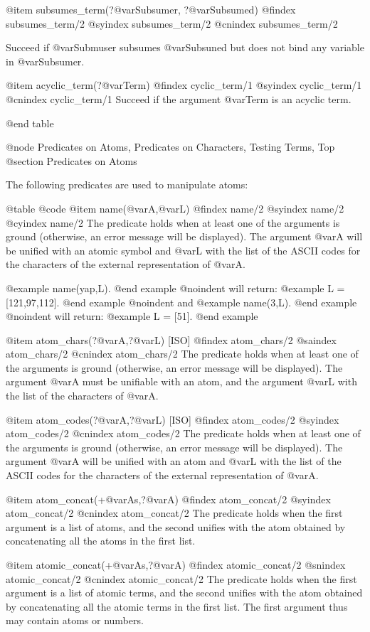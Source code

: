 {{{{@item subsumes_term(?@var{Subsumer}, ?@var{Subsumed})
@findex  subsumes_term/2
@syindex subsumes_term/2
@cnindex subsumes_term/2

Succeed if @var{Submuser} subsumes @var{Subsuned} but does not bind any
variable in @var{Subsumer}.

@item acyclic_term(?@var{Term})
@findex cyclic_term/1
@syindex cyclic_term/1
@cnindex cyclic_term/1
Succeed if the argument @var{Term} is an acyclic term.


@end table

@node Predicates on Atoms, Predicates on Characters, Testing Terms, Top
@section Predicates on Atoms

The following predicates are used to manipulate atoms:

@table @code
@item name(@var{A},@var{L})
@findex name/2
@syindex name/2
@cyindex name/2
The predicate holds when at least one of the arguments is ground
(otherwise, an error message will be displayed). The argument @var{A} will
be unified with an atomic symbol and @var{L} with the list of the ASCII
codes for the characters of the external representation of @var{A}.

@example
 name(yap,L).
@end example
@noindent
will return:
@example
 L = [121,97,112].
@end example
@noindent
and
@example
 name(3,L).
@end example
@noindent
will return:
@example
 L = [51].
@end example

@item atom_chars(?@var{A},?@var{L}) [ISO]
@findex atom_chars/2
@saindex atom_chars/2
@cnindex atom_chars/2
The predicate holds when at least one of the arguments is ground
(otherwise, an error message will be displayed). The argument @var{A} must
be unifiable with an atom, and the argument @var{L} with the list of the
characters of @var{A}.

@item atom_codes(?@var{A},?@var{L}) [ISO]
@findex atom_codes/2
@syindex atom_codes/2
@cnindex atom_codes/2
The predicate holds when at least one of the arguments is ground
(otherwise, an error message will be displayed). The argument @var{A} will
be unified with an atom and @var{L} with the list of the ASCII
codes for the characters of the external representation of @var{A}.

@item atom_concat(+@var{As},?@var{A})
@findex atom_concat/2
@syindex atom_concat/2
@cnindex atom_concat/2
The predicate holds when the first argument is a list of atoms, and the
second unifies with the atom obtained by concatenating all the atoms in
the first list.

@item atomic_concat(+@var{As},?@var{A})
@findex atomic_concat/2
@snindex atomic_concat/2
@cnindex atomic_concat/2
The predicate holds when the first argument is a list of atomic terms, and
the second unifies with the atom obtained by concatenating all the
atomic terms in the first list. The first argument thus may contain
atoms or numbers.

}}}}
